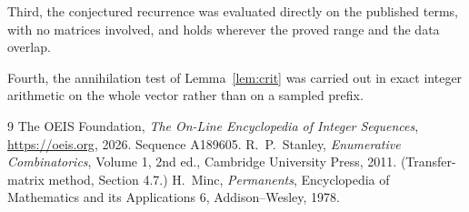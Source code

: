 \documentclass[11pt,a4paper]{article}
\theoremstyle{plain}
\theoremstyle{definition}
\begin{document}
Third, the conjectured recurrence was evaluated directly on the published terms, with no
matrices involved, and holds wherever the proved range and the data overlap.

Fourth, the annihilation test of Lemma~\ref{lem:crit} was carried out in exact integer
arithmetic on the whole vector rather than on a sampled prefix.

\begin{thebibliography}{9}
 The OEIS Foundation, \emph{The On-Line Encyclopedia of Integer
Sequences}, \url{https://oeis.org}, 2026. Sequence A189605.
 R.~P.~Stanley, \emph{Enumerative Combinatorics}, Volume 1, 2nd ed.,
Cambridge University Press, 2011. (Transfer-matrix method, Section 4.7.)
 H.~Minc, \emph{Permanents}, Encyclopedia of Mathematics and its
Applications 6, Addison--Wesley, 1978.
\end{thebibliography}
\end{document}
